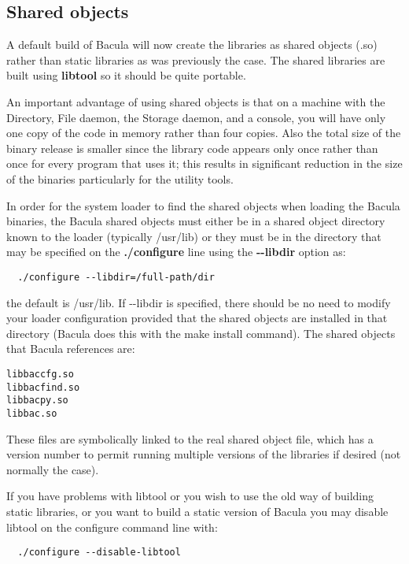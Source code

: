 \subsection{Shared objects}
A default build of Bacula will now create the libraries as shared objects
(.so) rather than static libraries as was previously the case.  
The shared libraries are built using {\bf libtool} so it should be quite
portable.

An important advantage of using shared objects is that on a machine with the
Directory, File daemon, the Storage daemon, and a console, you will have only
one copy of the code in memory rather than four copies.  Also the total size of
the binary release is smaller since the library code appears only once rather
than once for every program that uses it; this results in significant reduction
in the size of the binaries particularly for the utility tools.
 
In order for the system loader to find the shared objects when loading the
Bacula binaries, the Bacula shared objects must either be in a shared object
directory known to the loader (typically /usr/lib) or they must be in the
directory that may be specified on the {\bf ./configure} line using the {\bf
  {-}{-}libdir} option as:

\begin{verbatim}
  ./configure --libdir=/full-path/dir
\end{verbatim}

the default is /usr/lib. If {-}{-}libdir is specified, there should be
no need to modify your loader configuration provided that
the shared objects are installed in that directory (Bacula
does this with the make install command). The shared objects
that Bacula references are:

\begin{verbatim}
libbaccfg.so
libbacfind.so
libbacpy.so
libbac.so
\end{verbatim}

These files are symbolically linked to the real shared object file,
which has a version number to permit running multiple versions of
the libraries if desired (not normally the case).

If you have problems with libtool or you wish to use the old
way of building static libraries, or you want to build a static
version of Bacula you may disable
libtool on the configure command line with:

\begin{verbatim}
  ./configure --disable-libtool
\end{verbatim}


